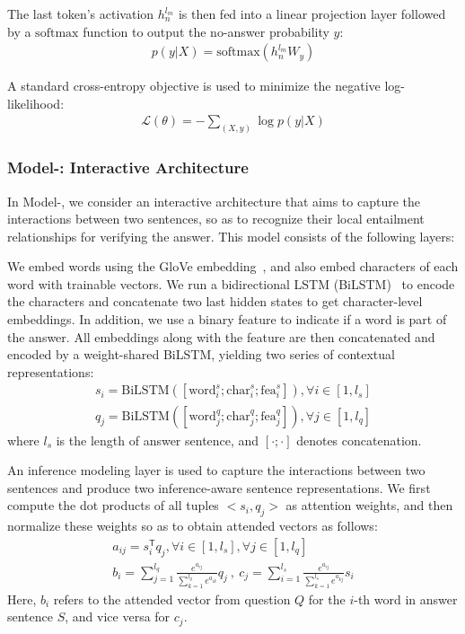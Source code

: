 \documentclass[letterpaper]{article} \usepackage{aaai19}  \usepackage{times}  \usepackage{helvet}  \usepackage{courier}  \usepackage{url}  \usepackage{graphicx}  \usepackage{pbox}
\begin{document}
The last token's activation $h_n^{l_m}$ is then fed into a linear projection layer followed by a $\mathrm{softmax}$ function to output the no-answer probability $y$:
\begin{eqnarray} 
	p(y|X) = \mathrm{softmax}(h_n^{l_m} W_y)	\nonumber
\end{eqnarray}

A standard cross-entropy objective is used to minimize the negative log-likelihood:
\begin{eqnarray} 
	\mathcal{L}(\theta) = - \sum_{(X,y)} \log p(y|X)	\nonumber
\end{eqnarray}

\subsubsection{Model-\uppercase\expandafter{}: Interactive Architecture}
In Model-\uppercase\expandafter{}, we consider an interactive architecture that aims to capture the interactions between two sentences, so as to recognize their local entailment relationships for verifying the answer. This model consists of the following layers:

We embed words using the GloVe embedding~\cite{Pennington14}, and also embed characters of each word with trainable vectors. 
We run a bidirectional LSTM (BiLSTM)~\cite{Hochreiter97} to encode the characters and concatenate two last hidden states to get character-level embeddings. 
In addition, we use a binary feature to indicate if a word is part of the answer.
All embeddings along with the feature are then concatenated and encoded by a weight-shared BiLSTM, yielding two series of contextual representations:
\begin{gather}
	s_i=\mathrm{BiLSTM}([\mathrm{word}_i^s; \mathrm{char}_i^s; \mathrm{fea}_i^s]), \forall i \in [1,l_s] \nonumber \\
	q_j=\mathrm{BiLSTM}([\mathrm{word}_j^q; \mathrm{char}_j^q; \mathrm{fea}_j^q]), \forall j \in [1,l_q] \nonumber  
\end{gather}
where $l_s$ is the length of answer sentence, and $[\cdot;\cdot]$ denotes concatenation.

An inference modeling layer is used to capture the interactions between two sentences and produce two inference-aware sentence representations. 
We first compute the dot products of all tuples $<s_i, q_j>$ as attention weights, and then normalize these weights so as to obtain attended vectors as follows:
\begin{gather}
	a_{ij} = s_i ^ \mathsf{T} q_j, \forall i \in [1,l_s], \forall j \in [1,l_q] \nonumber \\
	b_i = \sum_{j=1}^{l_q} \frac{e^{a_{ij}}}{\sum_{k=1}^{l_q} e^{a_{ik}}} q_j \ , \
	c_j = \sum_{i=1}^{l_s} \frac{e^{a_{ij}}}{\sum_{k=1}^{l_s} e^{a_{kj}}} s_i \nonumber
\end{gather}
Here, $b_i$ refers to the attended vector from question $Q$ for the $i$-th word in answer sentence $S$, and vice versa for $c_j$.
\end{document}
